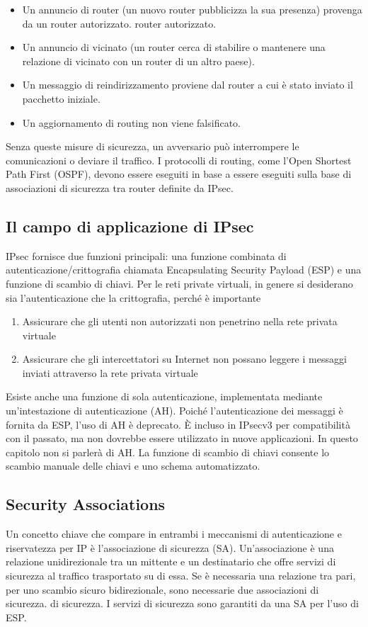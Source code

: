 \begin{itemize}
    \item Un annuncio di router (un nuovo router pubblicizza la sua presenza) provenga da un router autorizzato.
router autorizzato.

    \item Un annuncio di vicinato (un router cerca di stabilire o mantenere una relazione di vicinato con un router di un altro paese).
    
    \item Un messaggio di reindirizzamento proviene dal router a cui è stato inviato il pacchetto iniziale.
    
    \item Un aggiornamento di routing non viene falsificato.
\end{itemize}
Senza queste misure di sicurezza, un avversario può interrompere le comunicazioni o deviare il traffico. I protocolli di routing, come l'Open Shortest Path First (OSPF), devono essere eseguiti in base a essere eseguiti sulla base di associazioni di sicurezza tra router definite da IPsec.
\subsection{Il campo di applicazione di IPsec}
IPsec fornisce due funzioni principali: una funzione combinata di autenticazione/crittografia
chiamata Encapsulating Security Payload (ESP) e una funzione di scambio di chiavi. Per le reti private virtuali, in genere si desiderano sia l'autenticazione che la crittografia, perché è importante 

\begin{enumerate}
    \item Assicurare che gli utenti non autorizzati non penetrino nella rete privata virtuale
    
    \item Assicurare che gli intercettatori su Internet non possano leggere i messaggi inviati attraverso la rete privata virtuale
\end{enumerate}
Esiste anche una funzione di sola autenticazione, implementata mediante un'intestazione di autenticazione (AH). Poiché l'autenticazione dei messaggi è fornita da ESP, l'uso di AH è deprecato. È incluso in IPsecv3 per compatibilità con il passato, ma non dovrebbe essere utilizzato in nuove applicazioni. In questo capitolo non si parlerà di AH. La funzione di scambio di chiavi consente lo scambio manuale delle chiavi e uno schema automatizzato. 
\subsection{Security Associations}
Un concetto chiave che compare in entrambi i meccanismi di autenticazione e riservatezza per IP è l'associazione di sicurezza (SA). Un'associazione è una relazione unidirezionale tra un mittente e un destinatario che offre servizi di sicurezza al traffico trasportato su di essa. Se è necessaria una relazione tra pari, per uno scambio sicuro bidirezionale, sono necessarie due associazioni di sicurezza. di sicurezza. I servizi di sicurezza sono garantiti da una SA per l'uso di ESP.

